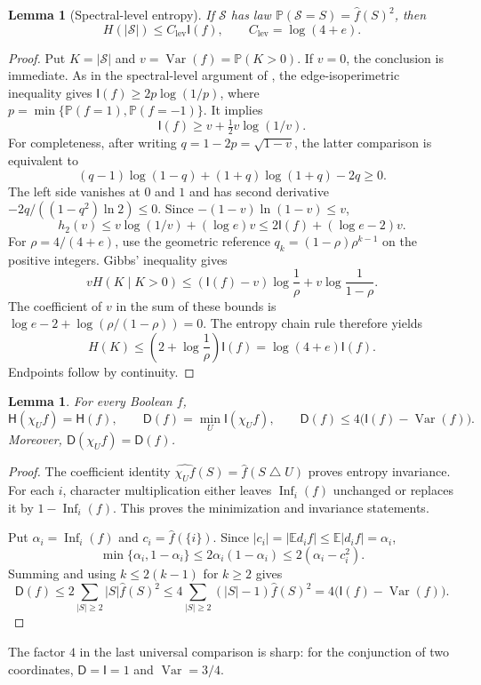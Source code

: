 \documentclass[11pt]{amsart}
\newtheorem{lemma}[theorem]{Lemma}
\theoremstyle{definition}
\theoremstyle{remark}
\newcommand{\E}{\mathbb E}
\renewcommand{\P}{\mathbb P}
\newcommand{\HH}{\mathsf H}
\newcommand{\I}{\mathsf I}
\newcommand{\D}{\mathsf D}
\DeclareMathOperator{\Var}{Var}
\DeclareMathOperator{\Inf}{Inf}
\newcommand{\wh}[1]{\widehat{#1}}
\newcommand{\symdiff}{\mathbin{\triangle}}
\newcommand{\Clev}{C_{\mathrm{lev}}}
\begin{document}
\begin{lemma}[Spectral-level entropy]\label{lem:levelentropy}
If $\mathcal S$ has law $\P(\mathcal S=S)=\wh f(S)^2$, then
\[
 H(|\mathcal S|)\le\Clev\I(f),\qquad \Clev=\log(4+e).
\]
\end{lemma}
\begin{proof}
Put $K=|\mathcal S|$ and $v=\Var(f)=\P(K>0)$.
If $v=0$, the conclusion is immediate.
As in the spectral-level argument of \cite[Theorem~5]{OWZ11},
the edge-isoperimetric inequality gives
$\I(f)\ge2p\log(1/p)$, where $p=\min\{\P(f=1),\P(f=-1)\}$.
It implies
\[
 \I(f)\ge v+\tfrac12v\log(1/v).
\]
For completeness, after writing $q=1-2p=\sqrt{1-v}$, the latter comparison is equivalent to
\[
 (q-1)\log(1-q)+(1+q)\log(1+q)-2q\ge0.
\]
The left side vanishes at $0$ and $1$ and has second derivative
$-2q/((1-q^2)\ln2)\le0$.
Since $-(1-v)\ln(1-v)\le v$,
\[
 h_2(v)\le v\log(1/v)+(\log e)v
          \le2\I(f)+(\log e-2)v.
\]
For $\rho=4/(4+e)$, use the geometric reference
$q_k=(1-\rho)\rho^{k-1}$ on the positive integers. Gibbs' inequality gives
\[
 vH(K\mid K>0)
 \le(\I(f)-v)\log\frac1\rho+v\log\frac1{1-\rho}.
\]
The coefficient of $v$ in the sum of these bounds is
$\log e-2+\log(\rho/(1-\rho))=0$.
The entropy chain rule therefore yields
\[
 H(K)\le\left(2+\log\frac1\rho\right)\I(f)
       =\log(4+e)\I(f).
\]
Endpoints follow by continuity.
\end{proof}

\begin{lemma}\label{lem:centering}
For every Boolean $f$,
\[
 \HH(\chi_U f)=\HH(f),\qquad
 \D(f)=\min_U\I(\chi_U f),\qquad
 \D(f)\le4\bigl(\I(f)-\Var(f)\bigr).
\]
Moreover, $\D(\chi_U f)=\D(f)$.
\end{lemma}
\begin{proof}
The coefficient identity
$\wh{\chi_Uf}(S)=\wh f(S\symdiff U)$ proves entropy invariance.
For each $i$, character multiplication either leaves $\Inf_i(f)$ unchanged or replaces it by $1-\Inf_i(f)$.
This proves the minimization and invariance statements.

Put $\alpha_i=\Inf_i(f)$ and $c_i=\wh f(\{i\})$.
Since $|c_i|=|\E d_i f|\le\E|d_i f|=\alpha_i$,
\[
 \min\{\alpha_i,1-\alpha_i\}
 \le2\alpha_i(1-\alpha_i)\le2(\alpha_i-c_i^2).
\]
Summing and using $k\le2(k-1)$ for $k\ge2$ gives
\[
 \D(f)\le2\sum_{|S|\ge2}|S|\wh f(S)^2
 \le4\sum_{|S|\ge2}(|S|-1)\wh f(S)^2
 =4\bigl(\I(f)-\Var(f)\bigr).
\]
\end{proof}

The factor $4$ in the last universal comparison is sharp: for the conjunction of two coordinates, $\D=\I=1$ and $\Var=3/4$.
\end{document}
